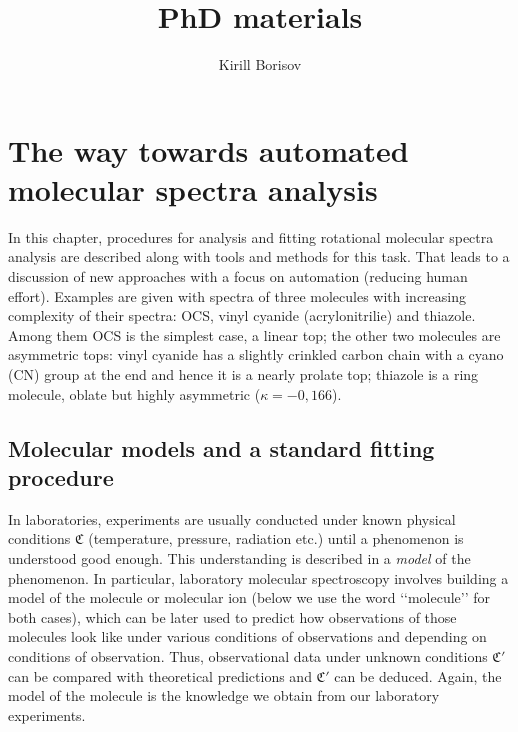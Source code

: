 \documentclass[11pt]{article}
\title{PhD materials}
\author{Kirill Borisov}
\begin{document}
\begin{titlepage}
\maketitle
\end{titlepage}

\tableofcontents
\newpage

%
%

\section{The way towards automated molecular spectra analysis}

In this chapter, procedures for analysis and fitting rotational molecular spectra analysis are described along with tools and methods for this task. That leads to a discussion of new approaches with a focus on automation (reducing human effort). Examples are given with spectra of three molecules with increasing complexity of their spectra: OCS, vinyl cyanide (acrylonitrilie) and thiazole. Among them OCS is the simplest case, a linear top; the other two molecules are asymmetric tops: vinyl cyanide has a slightly crinkled carbon chain with a cyano (CN) group at the end and hence it is a nearly prolate top; thiazole is a ring molecule, oblate but highly asymmetric ($\kappa=-0,166$).   

\subsection{Molecular models and a standard fitting procedure}

In laboratories, experiments are usually conducted under known physical conditions $\mathfrak{C}$ (temperature, pressure, radiation etc.) until a phenomenon is understood good enough. This understanding is described in a \emph{model} of the phenomenon. In particular, laboratory molecular spectroscopy involves building a model of the molecule or molecular ion (below we use the word \lq\lq{}molecule\rq\rq{} for both cases), which can be later used to predict how observations of those molecules look like under various conditions of observations and depending on conditions of observation. Thus, observational data under unknown conditions $\mathfrak{C}'$ can be compared with theoretical predictions and $\mathfrak{C}'$ can be deduced. Again, the model of the molecule is the knowledge we obtain from our laboratory experiments. 
\end{document}
